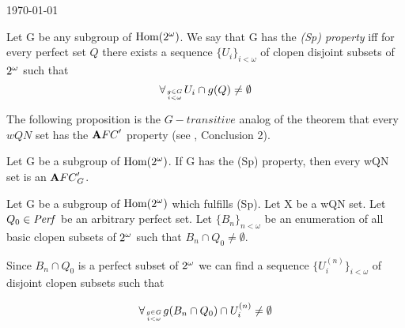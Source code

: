 \begin{center}
\today
\end{center}





\begin{definition}
Let G be any subgroup of ${\rm Hom(2^{\omega})}$. We say that G has the
{\it (Sp) property}\/
iff for every perfect set $Q$
there exists a sequence $\{ U_i \} _{i < \omega} $
of clopen disjoint subsets of $2^{\omega}$ such that
\[ \forall_{g \in G \atop i < \omega}
   U_i \cap g(Q) \not = \emptyset \]
\end{definition}

\bigskip

The following proposition is the $G - transitive$ analog
of the theorem that every $wQN$ set has the ${\mathbf AFC}^\prime$
property (see \cite{N}, Conclusion 2).

\begin{theorem}
Let G be a subgroup of ${\rm Hom(2^{\omega})}$. If G has the (Sp)
property, then every wQN set is an ${\mathbf AFC}^\prime_{G}$.
\end{theorem}

\proof

  Let G be a subgroup of ${\rm Hom(2^{\omega})}$ which fulfills (Sp).
Let X be a wQN set. Let $Q_0 \in {\it Perf}$
be an arbitrary perfect set.
  Let $\{ B_n \}_{n<\omega}$ be an enumeration of all
basic clopen subsets of $2^{\omega}$ such that
$B_n \cap Q_0 \not = \emptyset$.

Since $B_n \cap Q_0$ is a perfect subset of $2^{\omega}$ we can find
a sequence
$\lbrace U^{(n)}_i \rbrace _{i< \omega}$
of disjoint clopen subsets such that

\[
\forall_{g \in G \atop i < \omega}
g(B_n \cap Q_0) \cap U_i^{(n)} \not = \emptyset
\]

